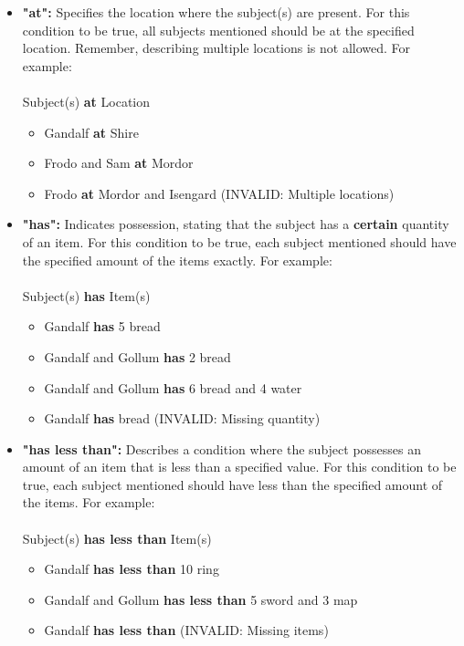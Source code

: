 \documentclass[12pt]{article}
\begin{document}
\begin{itemize}
    \item {\textbf{"at":} Specifies the location where the subject(s) are present. For this condition to be true, all subjects mentioned should be at the specified location. Remember, describing multiple locations is not allowed. For example:\\\\
    Subject(s) \textbf{at} Location
    \begin{itemize}
        \item Gandalf \textbf{at} Shire
        \item Frodo and Sam \textbf{at} Mordor
        \item Frodo \textbf{at} Mordor and Isengard (INVALID: Multiple locations) 
    \end{itemize}
    
    }

\item {\textbf{"has":} Indicates possession, stating that the subject has a \textbf{certain} quantity of an item. For this condition to be true, each subject mentioned should have the specified amount of the items exactly. For example: \\\\
Subject(s) \textbf{has} Item(s)
\begin{itemize}
        \item Gandalf \textbf{has} 5 bread
        \item Gandalf and Gollum \textbf{has} 2 bread
\item Gandalf and Gollum \textbf{has} 6 bread and 4 water
\item Gandalf \textbf{has} bread (INVALID: Missing quantity)

    \end{itemize}
}

\item {\textbf{"has less than":} Describes a condition where the subject possesses an amount of an item that is less than a specified value. For this condition to be true, each subject mentioned should have less than the specified amount of the items. For example: \\\\
Subject(s) \textbf{has less than} Item(s)
\begin{itemize}
        \item Gandalf \textbf{has less than} 10 ring
        \item Gandalf and Gollum \textbf{has less than} 5 sword and 3 map
        \item Gandalf \textbf{has less than} \space \space    (INVALID: Missing items)


\end{itemize}}
\end{itemize}
\end{document}
